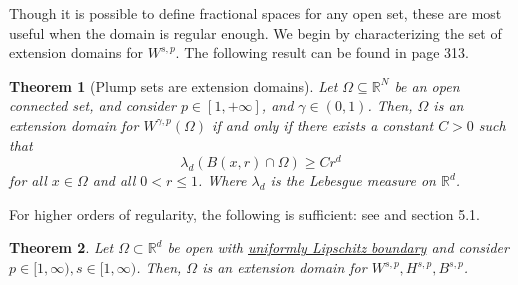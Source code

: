 \documentclass[
    a4paper,
    DIV=14,
    abstract=true,
    numbers=noenddot
]
{scrartcl}
\newtheorem{theorem}{Theorem}[section]
\theoremstyle{definition}
\newcommand{\R}{\mathbb{R}}
\begin{document}
Though it is possible to define fractional spaces for any open set, these are most useful when the domain is regular enough. We begin by characterizing the set of extension domains for $W^{s,p}$. The following result can be found in \cite{leoni2017first} page 313.
\begin{theorem}[Plump sets are extension domains]\label{plump sets}
    Let $\Omega \subseteq \mathbb{R}^N$ be an open connected set, and consider $p\in [1,+\infty]$, and $\gamma\in (0,1)$. Then, $\Omega$ is an extension domain for $W^{\gamma, p}(\Omega)$ if and only if there exists a constant $C>0$ such that
    $$
        \lambda_d(B(x, r) \cap \Omega) \geq C r^d
    $$
    for all $x \in \Omega$ and all $0<r \leq 1$. Where $\lambda_d$ is the Lebesgue measure on $\R^d$.
\end{theorem}
For higher orders of regularity, the following is sufficient: see \cite{leoni2023first} and \cite{sawano2018theory} section 5.1.
\begin{theorem}
    Let $\Omega \subset \R^d$ be open with \href{https://nowheredifferentiable.com/2023-07-12-PDEs-3-Sobolev_spaces/#:~:text=has-,uniformly%20Lipschitz%20boundary,-if%20there%20exists}{uniformly Lipschitz boundary} and consider   $p\in [1,\infty), s\in[1,\infty)$. Then, $\Omega $ is an extension domain for $W^{s,p},H^{s,p},B^{s,p}$.
\end{theorem}
\end{document}
